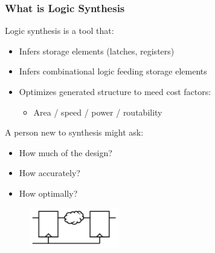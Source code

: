 \documentclass[t, notes, xcolor=table]{beamer}
\begin{document}
\begin{frame}
\frametitle{What is Logic Synthesis}
Logic synthesis is a tool that:
\begin{itemize}
\item Infers storage elements (latches, registers)
\item Infers combinational logic feeding storage elements
\item Optimizes generated structure to meed cost factors:
\begin{itemize}
	\item Area / speed / power / routability
\end{itemize}
\end{itemize}
\begin{multicols}{2}
A person new to synthesis might ask:
\begin{itemize}
\item How much of the design?
\item How accurately?
\item How optimally?
\end{itemize}
\vfill
\columnbreak
\begin{figure}
    \includegraphics[width=0.35\textwidth]{img/12_logic_synth.png}
\end{figure}
\end{multicols}
\end{frame}
\end{document}
